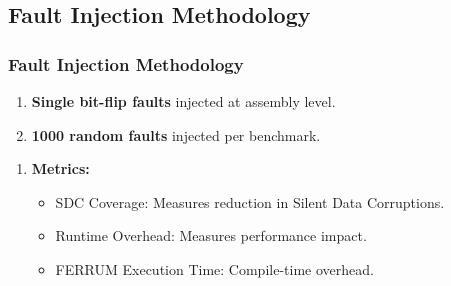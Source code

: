 \documentclass[
	12pt, %
]{beamer}
\begin{document}
\subsection{Fault Injection Methodology}
\begin{frame}
	\frametitle{Fault Injection Methodology}
	
	\begin{enumerate}
		\item \textbf{Single bit-flip faults} injected at assembly level.
		\item \textbf{1000 random faults} injected per benchmark.
	\end{enumerate}
	
	
	\begin{enumerate}
		\item \textbf{Metrics:}
		
		\begin{itemize}
			\item SDC Coverage: Measures reduction in Silent Data Corruptions. 
			
			\item Runtime Overhead: Measures performance impact. 
			
			\item FERRUM Execution Time: Compile-time overhead.

		\end{itemize}
	\end{enumerate}
\end{frame}





%	
%	
%	
%	
%	
\end{document}
